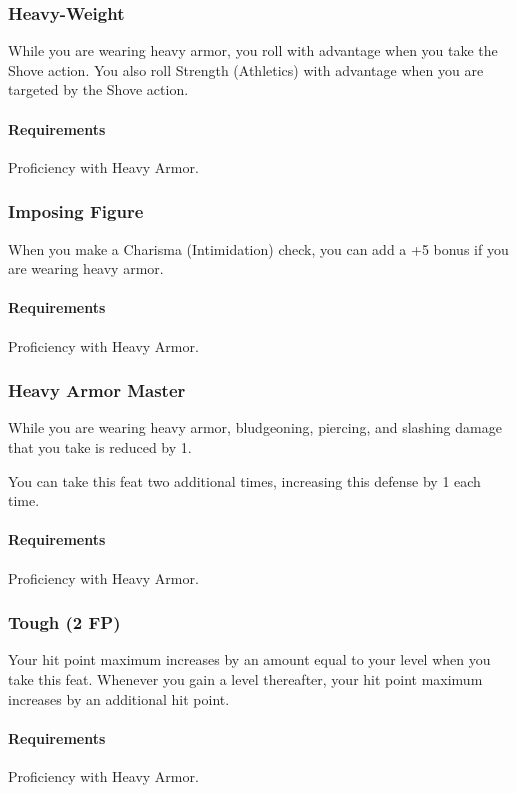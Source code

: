 \subsubsection{Heavy-Weight} \label{feat::heavyweight}
    While you are wearing heavy armor, you roll with advantage when you take the Shove action.
    You also roll Strength (Athletics) with advantage when you are targeted by the Shove action.
    \paragraph{Requirements} Proficiency with Heavy Armor.
\subsubsection{Imposing Figure} \label{feat::imposingfigure}
    When you make a Charisma (Intimidation) check, you can add a +5 bonus if you are wearing heavy armor.
    \paragraph{Requirements} Proficiency with Heavy Armor.
\subsubsection{Heavy Armor Master} \label{feat::heavyarmormaster}
    While you are wearing heavy armor, bludgeoning, piercing, and slashing damage that you take is reduced by 1.

    You can take this feat two additional times, increasing this defense by 1 each time.
    \paragraph{Requirements} Proficiency with Heavy Armor.
\subsubsection{Tough (2 FP)} \label{feat::tough}
    Your hit point maximum increases by an amount equal to your level when you take this feat.
    Whenever you gain a level thereafter, your hit point maximum increases by an additional hit point.
    \paragraph{Requirements} Proficiency with Heavy Armor.


